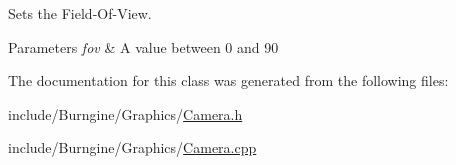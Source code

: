 Sets the Field-\/\-Of-\/\-View. 


\begin{DoxyParams}{Parameters}
{\em fov} & A value between 0 and 90 \\
\hline
\end{DoxyParams}


The documentation for this class was generated from the following files\-:\begin{DoxyCompactItemize}
\item 
include/\-Burngine/\-Graphics/\hyperlink{_camera_8h}{Camera.\-h}\item 
include/\-Burngine/\-Graphics/\hyperlink{_camera_8cpp}{Camera.\-cpp}\end{DoxyCompactItemize}
